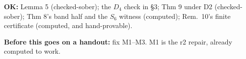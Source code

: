 \documentclass[11pt]{article}
\begin{document}
\textbf{OK:} Lemma 5 (checked-sober); the $D_4$ check in §3; Thm 9 under D2 (checked-sober);
Thm 8's band half and the $S_6$ witness (computed); Rem.~10's finite certificate (computed, and
hand-provable).

\textbf{Before this goes on a handout:} fix M1--M3. M1 is the r2 repair, already computed to work.
\end{document}
